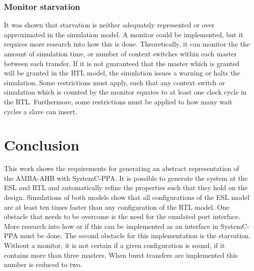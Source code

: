 \subsubsection{Monitor starvation}
It was shown that starvation is neither adequately represented or over approximated in the simulation model. A monitor could be implemented, but it requires more research into how this is done. Theoretically, it can monitor the the amount of simulation time, or number of context switches within each master between each transfer. If it is not guaranteed that the master which is granted will be granted in the RTL model, the simulation issues a warning or halts the simulation. Some restrictions must apply, such that any context switch or simulation which is counted by the monitor equates to at least one clock cycle in the RTL. Furthermore, some restrictions must be applied to how many wait cycles a slave can insert.    


\section{Conclusion}
\label{sec:concl}
This work shows the requirements for generating an abstract representation of the AMBA-AHB with SystemC-PPA. It is possible to generate the system at the ESL and RTL and automatically refine the properties such that they hold on the design. Simulations of both models show that all configurations of the ESL model are at least ten times faster than any configuration of the RTL model. One obstacle that needs to be overcome is the need for the emulated port interface. More research into how or if this can be implemented as an interface in SystemC-PPA must be done. The second obstacle for this implementation is the starvation. Without a monitor, it is not certain if a given configuration is sound, if it contains more than three masters. When burst transfers are implemented this number is reduced to two. 





     



